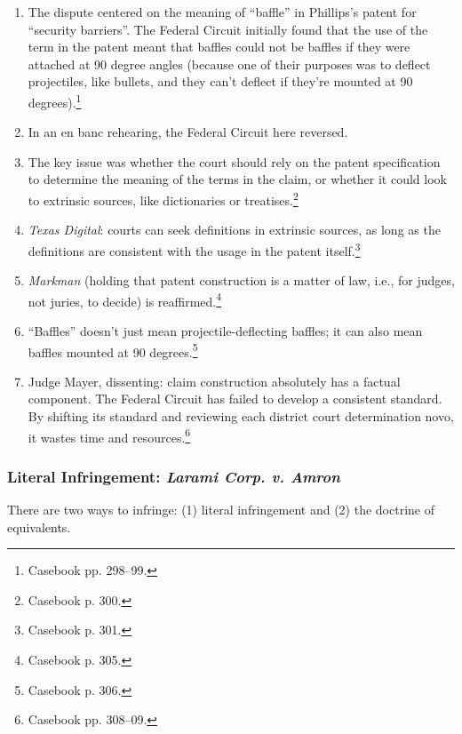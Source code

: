 \begin{enumerate}
    \item The dispute centered on the meaning of ``baffle'' in Phillips's 
    patent for ``security barriers''. The Federal Circuit initially found that 
    the use of the term in the patent meant that baffles could not be baffles 
    if they were attached at 90 degree angles (because one of their purposes 
    was to deflect projectiles, like bullets, and they can't deflect if 
    they're mounted at 90 degrees).\footnote{Casebook pp. 298--99.}
    \item In an en banc rehearing, the Federal Circuit here reversed.
    \item The key issue was whether the court should rely on the patent 
    specification to determine the meaning of the terms in the claim, or 
    whether it could look to extrinsic sources, like dictionaries or 
    treatises.\footnote{Casebook p.  300.}
    \item \emph{Texas Digital}: courts can seek definitions in extrinsic 
    sources, as long as the definitions are consistent with the usage in the 
    patent itself.\footnote{Casebook p. 301.}
    \item \emph{Markman} (holding that patent construction is a matter of law, 
    i.e., for judges, not juries, to decide) is reaffirmed.\footnote{Casebook p. 
    305.}
    \item ``Baffles'' doesn't just mean projectile-deflecting baffles; it can 
    also mean baffles mounted at 90 degrees.\footnote{Casebook p. 306.}
    \item Judge Mayer, dissenting: claim construction absolutely has a factual 
    component. The Federal Circuit has failed to develop a consistent standard. 
    By shifting its standard and reviewing each district court determination 
    novo, it wastes time and resources.\footnote{Casebook pp. 308--09.}
\end{enumerate}

\subsubsection{Literal Infringement: \emph{Larami Corp. v. Amron}}

There are two ways to infringe: (1) literal infringement and (2) the doctrine 
of equivalents.

